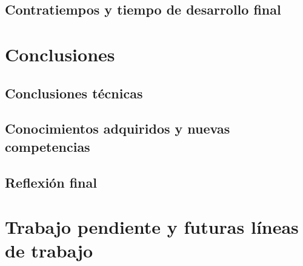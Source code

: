 \section{Contratiempos y tiempo de desarrollo final}

\chapter{Conclusiones}\label{chap:conclussions}
\section{Conclusiones técnicas}
\section{Conocimientos adquiridos y nuevas competencias}
\section{Reflexión final}

\chapter{Trabajo pendiente y futuras líneas de trabajo}\label{chap:pending-work}
